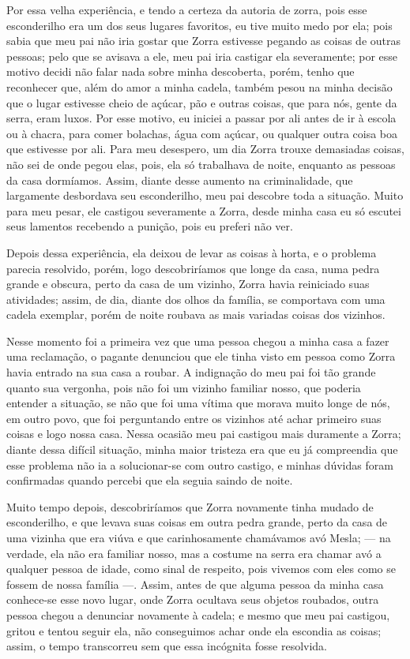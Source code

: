 Por essa velha experiência, e tendo a certeza da autoria de zorra, pois esse esconderilho era um dos seus lugares favoritos, eu tive muito medo por ela; pois sabia que meu pai não iria gostar que Zorra estivesse pegando as coisas de outras pessoas; pelo que se avisava a ele, meu pai iria castigar ela severamente; por esse motivo decidi não falar nada sobre minha descoberta, porém, tenho que reconhecer que, além do amor a minha cadela, também pesou na minha decisão que o lugar estivesse cheio de açúcar, pão e outras coisas, que para nós, gente da serra, eram luxos. 
Por esse motivo, eu iniciei a passar por ali antes de ir à escola ou à chacra, para comer bolachas, água com açúcar, ou qualquer outra coisa boa que estivesse por ali. 
Para meu desespero, um dia Zorra trouxe demasiadas coisas, não sei de onde pegou elas, pois, ela só trabalhava de noite, enquanto as pessoas da casa dormíamos. Assim, diante desse aumento na criminalidade, que largamente desbordava seu esconderilho, meu pai descobre toda a situação.
Muito para meu pesar, ele castigou severamente a Zorra, desde minha casa eu só escutei seus lamentos recebendo a punição, pois eu preferi não ver.

Depois dessa experiência, ela deixou de  levar as coisas à horta, e o problema parecia resolvido, porém, logo descobriríamos que longe da casa, numa pedra grande e obscura, perto da casa de um vizinho, Zorra havia reiniciado suas atividades; assim, de dia, diante dos olhos da família, se comportava com uma cadela exemplar, porém de noite roubava as mais variadas coisas dos vizinhos.

Nesse momento foi a primeira vez que uma pessoa chegou a minha casa a fazer uma reclamação, o pagante denunciou que ele tinha visto em pessoa como Zorra havia entrado na sua casa a roubar. 
A indignação do meu pai foi tão grande quanto sua vergonha, pois não foi um vizinho familiar nosso, que poderia entender a situação, se não que foi uma vítima que morava muito longe de nós, em outro povo, que foi perguntando entre os vizinhos até achar primeiro suas coisas e logo nossa casa.
Nessa ocasião meu pai castigou mais duramente a Zorra; diante dessa difícil situação, minha maior tristeza era que eu já compreendia que esse problema não ia a solucionar-se com outro castigo, e minhas dúvidas foram confirmadas quando percebi que ela seguia saindo de noite. 

Muito tempo depois, descobriríamos que Zorra novamente tinha mudado de esconderilho, e que levava suas coisas em outra pedra grande, perto da casa de uma vizinha que era viúva e que carinhosamente chamávamos avó Mesla; --- na verdade, ela não era familiar nosso, mas a costume na serra era chamar avó a qualquer pessoa de idade, como sinal de respeito, pois vivemos com eles como se fossem de nossa família ---.
Assim, antes de que alguma pessoa da minha casa conhece-se esse novo lugar, onde Zorra ocultava seus objetos roubados, outra pessoa chegou a denunciar novamente à cadela; e mesmo que meu pai castigou, gritou e tentou seguir ela, não conseguimos achar onde ela escondia as coisas; assim, o tempo transcorreu sem que essa incógnita fosse resolvida. 


